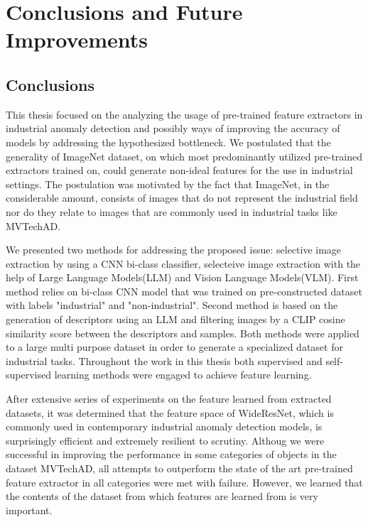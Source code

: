 \chapter{Conclusions and Future Improvements}
\label{chapter:ch5}

\section{Conclusions}

This thesis focused on the analyzing the usage of pre-trained feature extractors in industrial anomaly detection\cite{iad_survey}\cite{uiad_survey}\cite{pre_trained_iad} and possibly ways of improving the accuracy of models by addressing the hypothesized bottleneck. We postulated that the generality of ImageNet dataset\cite{imagenet}, on which most predominantly utilized pre-trained extractors trained on, could generate non-ideal features for the use in industrial settings. The postulation was motivated by the fact that ImageNet, in the considerable amount, consists of images that do not represent the industrial field nor do they relate to images that are commonly used in industrial tasks like MVTechAD\cite{mvtecad}. 

We presented two methods for addressing the proposed issue: selective image extraction by using a CNN\cite{lenet} bi-class classifier, selecteive image extraction with the help of Large Language Models(LLM)\cite{llm_survey}\cite{gpt3} and Vision Language Models(VLM)\cite{vlm_survey}\cite{clip}. First method relies on bi-class CNN model that was trained on pre-constructed dataset with labels "industrial" and "non-industrial". Second method is based on the generation of descriptors using an LLM and filtering images by a CLIP\cite{clip} cosine similarity score between the descriptors and samples. Both methods were applied to a large multi purpose dataset in order to generate a specialized dataset for industrial tasks. Throughout the work in this thesis both supervised and self-supervised learning methods\cite{self_supervised_survey}\cite{dino} were engaged to achieve feature learning.

After extensive series of experiments on the feature learned from extracted datasets, it was determined that the feature space of WideResNet\cite{wideresnet}, which is commonly used in contemporary industrial anomaly detection models\cite{patchcore}\cite{pre_trained_iad}, is surprisingly efficient and extremely resilient to scrutiny. Althoug we were successful in improving the performance in some categories of objects in the dataset MVTechAD, all attempts to outperform the state of the art pre-trained feature extractor in all categories were met with failure. However, we learned that the contents of the dataset from which features are learned from is very important.

